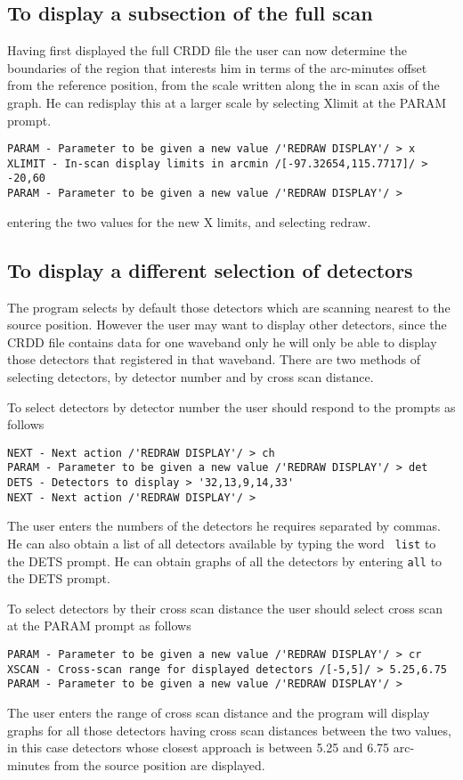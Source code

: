 \documentclass[twoside,11pt]{article}
\begin{document}
\subsection{To display a subsection of the full scan}
Having first displayed the full CRDD file the user can now determine the
boundaries of the region that interests him in terms of the arc-minutes offset
from the reference position, from the scale written along the in scan axis of
the graph. He can redisplay this at a larger scale by selecting Xlimit at the
PARAM prompt.
\begin{small}
\begin{verbatim}
PARAM - Parameter to be given a new value /'REDRAW DISPLAY'/ > x
XLIMIT - In-scan display limits in arcmin /[-97.32654,115.7717]/ > -20,60
PARAM - Parameter to be given a new value /'REDRAW DISPLAY'/ > 
\end{verbatim}
\end{small}
entering the two values for the new X limits, and selecting redraw.
\subsection{To display a different selection of detectors}
The program selects by default those detectors which are scanning nearest to 
the source position. However the user may want to display other detectors,
since the CRDD file contains data for one waveband only he will only be able
to display those detectors that registered in that waveband. There are two
methods of selecting detectors, by detector number and by cross scan distance.

To select detectors by detector number the user should respond to the prompts
as follows
\begin{small}
\begin{verbatim}
NEXT - Next action /'REDRAW DISPLAY'/ > ch
PARAM - Parameter to be given a new value /'REDRAW DISPLAY'/ > det
DETS - Detectors to display > '32,13,9,14,33'
NEXT - Next action /'REDRAW DISPLAY'/ > 
\end{verbatim}
\end{small}
The user enters the numbers of the detectors he requires separated by commas.
He can also obtain a list of all detectors available by typing the word {\tt
list} to the DETS prompt. He can obtain graphs of all the detectors by entering
{\tt all} to the DETS prompt.

To select detectors by their cross scan distance the user should select cross
scan at the PARAM prompt as follows
\begin{small}
\begin{verbatim}
PARAM - Parameter to be given a new value /'REDRAW DISPLAY'/ > cr
XSCAN - Cross-scan range for displayed detectors /[-5,5]/ > 5.25,6.75
PARAM - Parameter to be given a new value /'REDRAW DISPLAY'/ > 
\end{verbatim}
\end{small}
The user enters the range of cross scan distance and the program will display
graphs for all those detectors having cross scan distances between the two
values, in this case detectors whose closest approach is between 5.25 and
6.75 arc-minutes from the source position are displayed.
\end{document}
